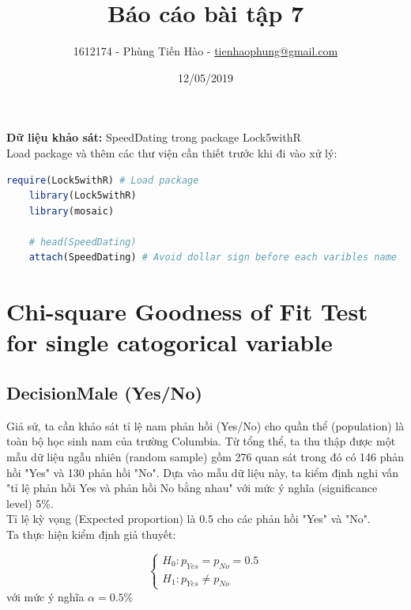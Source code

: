 \documentclass[a4paper,12pt]{article}
\title{Báo cáo bài tập 7}
\author{1612174 - Phùng Tiến Hào - \href{mailto:tienhaophung@gmail.com}{tienhaophung@gmail.com}}
\date{12/05/2019}
\begin{document}
	\maketitle
	\newpage
	
	\doublespacing
	\tableofcontents
	\singlespace
	
	\newpage
	
	\textbf{Dữ liệu khảo sát:} SpeedDating trong package Lock5withR\\
	
	Load package và thêm các thư viện cần thiết trước khi đi vào xử lý:
	\begin{lstlisting}[language=R]
	require(Lock5withR) # Load package
	library(Lock5withR)
	library(mosaic)
	
	# head(SpeedDating)
	attach(SpeedDating) # Avoid dollar sign before each varibles name
	\end{lstlisting}
	
	\section{Chi-square Goodness of Fit Test for single catogorical variable}
	\subsection{DecisionMale (Yes/No)}
	
	Giả sử, ta cần khảo sát tỉ lệ nam phản hồi (Yes/No) cho quần thể (population) là toàn bộ học sinh nam của trường Columbia. Từ tổng thể, ta thu thập được một mẫu dữ liệu ngẫu nhiên (random sample) gồm 276 quan sát trong đó có 146 phản hồi "Yes" và 130 phản hồi "No". Dựa vào mẫu dữ liệu này, ta kiểm định nghi vấn "tỉ lệ phản hồi Yes và phản hồi No bằng nhau" với mức ý nghĩa (significance level) 5\%.\\
	
	Tỉ lệ kỳ vọng (Expected proportion) là $0.5$ cho các phản hồi "Yes" và "No".\\
	
	Ta thực hiện kiểm định giả thuyết:
	
	\begin{equation*}
		\begin{cases}
		H_0: p_{Yes} = p_{No} = 0.5\\
		H_1: p_{Yes} \neq p_{No}
		\end{cases}
	\end{equation*}
	với mức ý nghĩa $\alpha = 0.5\%$\\
	
\end{document}
